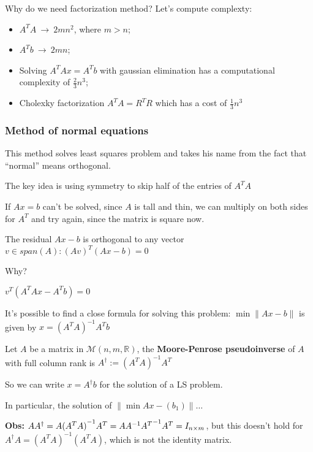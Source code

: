 \documentclass[computationalMathematics.tex]{subfiles}
\begin{document}
Why do we need factorization method?
Let's compute complexty:
\begin{itemize}
  \item ${A}^{T}A ~ \rightarrow ~ 2m{n}^{2}$, where $m>n$;
  \item ${A}^{T}b ~ \rightarrow ~ 2mn$;
  \item Solving ${A}^{T}Ax={A}^{T}b$ with gaussian elimination has a computational complexity of $\frac{2}{3}{n}^{3}$;
  \item Cholexky factorization ${A}^{T}A={R}^{T}R$ which has a cost of $\frac{1}{3}{n}^{3}$


\end{itemize}

\subsubsection{Method of normal equations}
This method solves least squares problem and takes his name from the fact that ``normal'' means orthogonal.

The key idea is using symmetry to skip half of the entries of ${A}^{T}A$

If $Ax=b$ can't be solved, since $A$ is tall and thin, we can multiply on both sides for ${A}^{T}$ and try again, since the matrix is square now.

The residual $Ax-b$ is orthogonal to any vector $v \in span(A): {(Av)}^{T} (Ax-b)=0$

Why?

$v^T({A}^{T}Ax - {A}^{T}b) = 0$


It's possible to find a close formula for solving this problem: $\min\|Ax-b\|$ is given by $x={({A}^{T}A)}^{-1}{A}^{T}b$

\begin{definition}
  Let $A$ be a matrix in $\mathcal{M}(n, m, \mathds{R})$, the \textbf{Moore-Penrose pseudoinverse} of $A$ with full column rank is ${A}^{\dag} := {({A}^{T}A)}^{-1}{A}^{T}$
\end{definition}

So we can write $x={A}^{\dag}b$ for the solution of a LS problem.

In particular, the solution of $\|\min Ax - ({b}_{1})\| \dots$

\textbf{Obs:} $A{A}^{\dag} = A {({A}^{T}A)}^{-1} {A}^{T} = A {A}^{-1} {{A}^{T}}^{-1} {A}^{T} = I_{n \times m}$, but this doesn't hold for ${A}^{\dag}A = {({A}^{T}A)}^{-1}({A}^{T}A)$, which is not the identity matrix.
\end{document}
